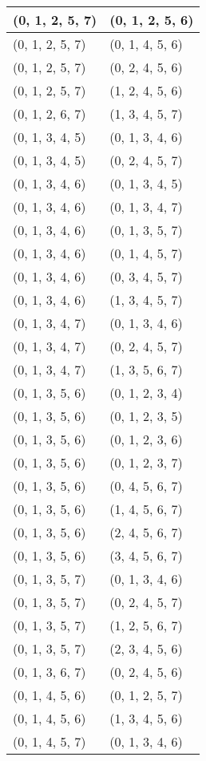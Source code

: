 \begin{footnotesize}
\begin{longtable}[c]{|l|l|}
(0, 1, 2, 5, 7)
&(0, 1, 2, 5, 6)
\\ \hline
(0, 1, 2, 5, 7)
&(0, 1, 4, 5, 6)
\\ \hline
(0, 1, 2, 5, 7)
&(0, 2, 4, 5, 6)
\\ \hline
(0, 1, 2, 5, 7)
&(1, 2, 4, 5, 6)
\\ \hline
(0, 1, 2, 6, 7)
&(1, 3, 4, 5, 7)
\\ \hline
(0, 1, 3, 4, 5)
&(0, 1, 3, 4, 6)
\\ \hline
(0, 1, 3, 4, 5)
&(0, 2, 4, 5, 7)
\\ \hline
(0, 1, 3, 4, 6)
&(0, 1, 3, 4, 5)
\\ \hline
(0, 1, 3, 4, 6)
&(0, 1, 3, 4, 7)
\\ \hline
(0, 1, 3, 4, 6)
&(0, 1, 3, 5, 7)
\\ \hline
(0, 1, 3, 4, 6)
&(0, 1, 4, 5, 7)
\\ \hline
(0, 1, 3, 4, 6)
&(0, 3, 4, 5, 7)
\\ \hline
(0, 1, 3, 4, 6)
&(1, 3, 4, 5, 7)
\\ \hline
(0, 1, 3, 4, 7)
&(0, 1, 3, 4, 6)
\\ \hline
(0, 1, 3, 4, 7)
&(0, 2, 4, 5, 7)
\\ \hline
(0, 1, 3, 4, 7)
&(1, 3, 5, 6, 7)
\\ \hline
(0, 1, 3, 5, 6)
&(0, 1, 2, 3, 4)
\\ \hline
(0, 1, 3, 5, 6)
&(0, 1, 2, 3, 5)
\\ \hline
(0, 1, 3, 5, 6)
&(0, 1, 2, 3, 6)
\\ \hline
(0, 1, 3, 5, 6)
&(0, 1, 2, 3, 7)
\\ \hline
(0, 1, 3, 5, 6)
&(0, 4, 5, 6, 7)
\\ \hline
(0, 1, 3, 5, 6)
&(1, 4, 5, 6, 7)
\\ \hline
(0, 1, 3, 5, 6)
&(2, 4, 5, 6, 7)
\\ \hline
(0, 1, 3, 5, 6)
&(3, 4, 5, 6, 7)
\\ \hline
(0, 1, 3, 5, 7)
&(0, 1, 3, 4, 6)
\\ \hline
(0, 1, 3, 5, 7)
&(0, 2, 4, 5, 7)
\\ \hline
(0, 1, 3, 5, 7)
&(1, 2, 5, 6, 7)
\\ \hline
(0, 1, 3, 5, 7)
&(2, 3, 4, 5, 6)
\\ \hline
(0, 1, 3, 6, 7)
&(0, 2, 4, 5, 6)
\\ \hline
(0, 1, 4, 5, 6)
&(0, 1, 2, 5, 7)
\\ \hline
(0, 1, 4, 5, 6)
&(1, 3, 4, 5, 6)
\\ \hline
(0, 1, 4, 5, 7)
&(0, 1, 3, 4, 6)

\end{longtable}
\end{footnotesize}

